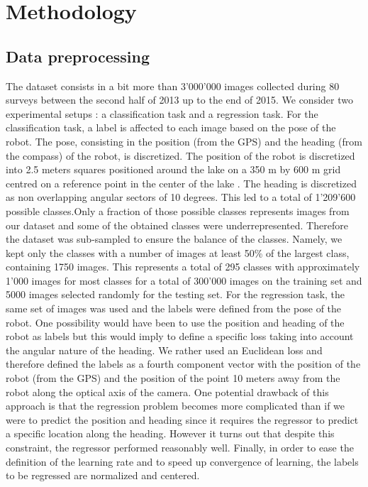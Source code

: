 \section{Methodology}

%

%

\subsection{Data preprocessing}


The dataset consists in a bit more than 3'000'000 images collected during 80 surveys between the second half of 2013 up to the end of 2015. We consider two experimental setups : a classification task and a regression task. For the classification task, a label is affected to each image based on the pose of the robot. The pose, consisting in the position (from the GPS) and the heading (from the compass) of the robot, is discretized. The position of the robot is discretized into 2.5 meters squares positioned around the lake on a 350 m by 600 m grid centred on a reference point in the center of the lake . The heading is discretized as non overlapping angular sectors of 10 degrees. This led to a total of 1'209'600 possible classes.Only a fraction of those possible classes represents images from our dataset and some of the obtained classes were underrepresented. Therefore the dataset was sub-sampled to ensure the balance of the classes. Namely, we kept only the classes with a number of images at least 50\% of the largest class, containing 1750 images. This represents a total of 295 classes with approximately 1'000 images for most classes for a total of 300'000 images on the training set  and 5000 images selected randomly for the testing set. For the regression task, the same set of images was used and the labels were defined from the pose of the robot. One possibility would have been to use the position and heading of the robot as labels but this would imply to define a specific loss taking into account the angular nature of the heading. We rather used an Euclidean loss and therefore defined the labels as a fourth component vector with the position of the robot (from the GPS) and the position of the point 10 meters away from the robot along the optical axis of the camera. One potential drawback of this approach is that the regression problem becomes more complicated than if we were to predict the position and heading since it requires the regressor to predict a specific location along the heading. However it turns out that despite this constraint, the regressor performed reasonably well. Finally, in order to ease the definition of the learning rate and to speed up convergence of learning, the labels to be regressed are normalized and centered.


